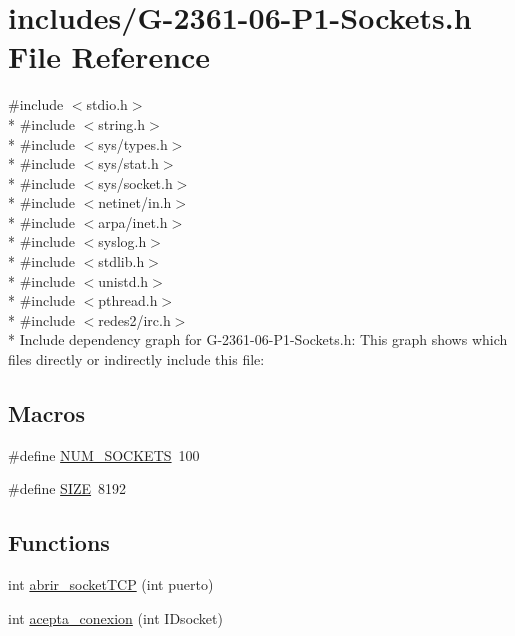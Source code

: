 \hypertarget{_g-2361-06-_p1-_sockets_8h}{}\section{includes/\+G-\/2361-\/06-\/\+P1-\/\+Sockets.h File Reference}
\label{_g-2361-06-_p1-_sockets_8h}
{\ttfamily \#include $<$stdio.\+h$>$}\\*
{\ttfamily \#include $<$string.\+h$>$}\\*
{\ttfamily \#include $<$sys/types.\+h$>$}\\*
{\ttfamily \#include $<$sys/stat.\+h$>$}\\*
{\ttfamily \#include $<$sys/socket.\+h$>$}\\*
{\ttfamily \#include $<$netinet/in.\+h$>$}\\*
{\ttfamily \#include $<$arpa/inet.\+h$>$}\\*
{\ttfamily \#include $<$syslog.\+h$>$}\\*
{\ttfamily \#include $<$stdlib.\+h$>$}\\*
{\ttfamily \#include $<$unistd.\+h$>$}\\*
{\ttfamily \#include $<$pthread.\+h$>$}\\*
{\ttfamily \#include $<$redes2/irc.\+h$>$}\\*
Include dependency graph for G-\/2361-\/06-\/\+P1-\/\+Sockets.h\+:
This graph shows which files directly or indirectly include this file\+:
\subsection*{Macros}
\begin{DoxyCompactItemize}
\item 
\#define \hyperlink{_g-2361-06-_p1-_sockets_8h_a1c803e4ececfb47d2791c9283c85eb00}{N\+U\+M\+\_\+\+S\+O\+C\+K\+E\+TS}~100
\item 
\#define \hyperlink{_g-2361-06-_p1-_sockets_8h_a70ed59adcb4159ac551058053e649640}{S\+I\+ZE}~8192
\end{DoxyCompactItemize}
\subsection*{Functions}
\begin{DoxyCompactItemize}
\item 
int \hyperlink{_g-2361-06-_p1-_sockets_8h_af2f55f83053c8fdebb8da511cd65880c}{abrir\+\_\+socket\+T\+CP} (int puerto)
\item 
int \hyperlink{_g-2361-06-_p1-_sockets_8h_a172e85f036cff044fd5ba218460115c7}{acepta\+\_\+conexion} (int I\+Dsocket)
\end{DoxyCompactItemize}


